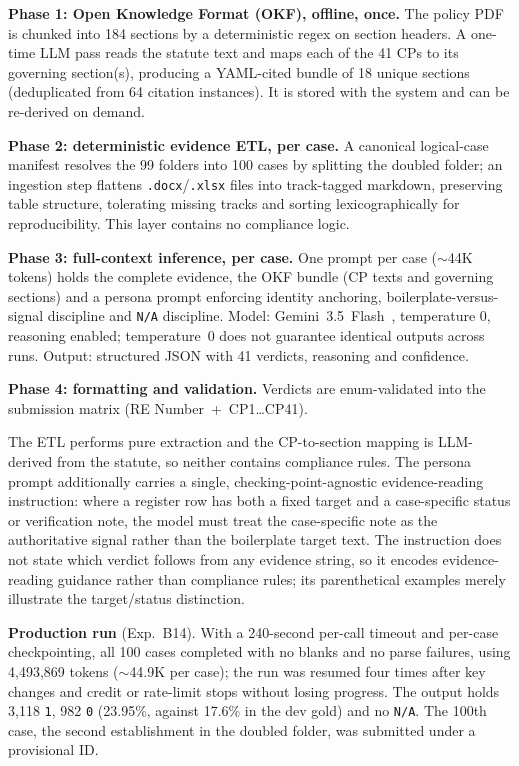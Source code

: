\noindent\textbf{Phase 1: Open Knowledge Format (OKF), offline, once.} The policy PDF is chunked
into 184 sections by a deterministic regex on section headers. A one-time LLM pass
reads the statute text and maps each of the 41 CPs to its governing section(s),
producing a YAML-cited bundle of 18 unique sections (deduplicated from 64 citation
instances). It is stored with the system and can be re-derived on demand.

\noindent\textbf{Phase 2: deterministic evidence ETL, per case.} A canonical logical-case manifest
resolves the 99 folders into 100 cases by splitting the doubled folder;
an ingestion step flattens \texttt{.docx}/\texttt{.xlsx} files into track-tagged
markdown, preserving table structure, tolerating missing tracks and sorting
lexicographically for reproducibility. This layer contains no compliance logic.

\noindent\textbf{Phase 3: full-context inference, per case.} One prompt per case
($\sim$44K tokens) holds the complete evidence, the OKF bundle (CP texts and governing
sections) and a persona prompt enforcing identity anchoring, boilerplate-versus-signal
discipline and \texttt{N/A} discipline. Model: Gemini~3.5~Flash~\cite{geminiteam2023},
temperature 0, reasoning enabled; temperature~0 does not guarantee identical outputs
across runs. Output: structured JSON with 41 verdicts, reasoning and confidence.

\noindent\textbf{Phase 4: formatting and validation.} Verdicts are enum-validated into the
submission matrix (RE Number~+~CP1\ldots CP41).

The ETL performs pure extraction and the CP-to-section mapping is LLM-derived from the
statute, so neither contains compliance rules. The persona prompt additionally carries
a single, checking-point-agnostic evidence-reading instruction: where a register row
has both a fixed target and a case-specific status or verification note, the model
must treat the case-specific note as the authoritative signal rather than the
boilerplate target text. The instruction does not state which verdict follows from
any evidence string, so it encodes evidence-reading guidance rather than compliance
rules; its parenthetical examples merely illustrate the target/status distinction.

\noindent\textbf{Production run} (Exp.~B14). With a 240-second per-call timeout and
per-case checkpointing, all 100 cases completed with no blanks and no parse failures,
using 4{,}493{,}869 tokens ($\sim$44.9K per case); the run was resumed four times after
key changes and credit or rate-limit stops without losing progress. The output holds
3{,}118 \texttt{1}, 982 \texttt{0} (23.95\%, against 17.6\% in the dev gold) and no
\texttt{N/A}. The 100th case, the second establishment in the doubled folder, was submitted under a
provisional ID.

